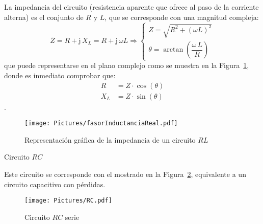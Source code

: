 \documentclass[11pt]{book} %
\makeatletter
\numberwithin{dummy}{section}
\theoremstyle{ocrenumbox}
\theoremstyle{blacknumex}
\theoremstyle{blacknumbox}
\theoremstyle{ocrenum}
\renewcommand{\subsection}{\@startsection {subsection}{2}{\z@}
{-3ex \@plus -0.1ex \@minus -.4ex}
{0.5ex \@plus.2ex }
{\normalfont\sffamily\bfseries}}
\newlength\esp
\makeatother
\begin{document}
	La impedancia del circuito (resistencia aparente que ofrece al paso de la corriente alterna) es el conjunto de $R$ y $L$, que se corresponde con una magnitud compleja: 
	\begin{equation}
		\boxed{ \overline{Z} = R + \mathrm{j}\,X_L = R+ \mathrm{j}\,\omega L \Rightarrow 
			\begin{cases}
				Z=\sqrt{R^2+(\omega L)^2}\\
				\theta=\arctan\left(\dfrac{\omega\,L}{R} \right)
		\end{cases}}
	\end{equation}
	que puede representarse en el plano complejo como se muestra en la Figura~\ref{fig.fasorinductanciareal}, donde es inmediato comprobar que:
	\begin{align*}
		R&=Z\cdot\cos(\theta)\\
		X_L&=Z\cdot\sin(\theta)
	\end{align*}. 
	\begin{figure}[htbp]
		\centering
		\texttt{[image: Pictures/fasorInductanciaReal.pdf]}
		\caption{Representación gráfica de la impedancia de un circuito $RL$}
		\label{fig.fasorinductanciareal}
	\end{figure}
	
	\subsection{Circuito $RC$}\label{sec.RC}
	
	Este circuito se corresponde con el mostrado en la Figura~\ref{fig.RC}, equivalente a un circuito capacitivo con pérdidas. 
	\begin{figure}[h]
		\centering
		\texttt{[image: Pictures/RC.pdf]}
		\caption{Circuito $RC$ serie}
		\label{fig.RC}
	\end{figure}
	
\end{document}
